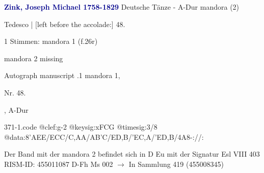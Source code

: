 \documentclass[twocolumn]{book}
\begin{document}
\newline \par \vspace{7pt} \textcolor{darkblue}{\textbf{Zink, Joseph Michael  1758-1829}}
\newline Deutsche Tänze - A-Dur
\newline mandora (2)
\newline \begin{itshape}[f.26r, at left:] Tedesco | [left before the accolade:] 48.\end{itshape} 
\newline \textcolor{darkblue}{}  1 Stimmen: mandora 1  (f.26r)
\newline \begin{small} mandora 2 missing\end{small} 
\newline Autograph manuscript
.1  mandora 1, \begin{itshape}Nr. 48.\end{itshape}, A-Dur  
\begin{filecontents*}{371-1.code}
@clef:g-2
@keysig:xFCG
@timesig:3/8
@data:{8'AEE}/{ECC}/{C,AA}/{AB'C}/{ED,B}/{'EC,A}/{'ED,B}/4A8-://:
\end{filecontents*}
\newline
%
\newline Der Band mit der mandora 2 befindet sich in D Eu mit der Signatur Esl VIII 403
\newline RISM-ID: 455011087
\newline D-Fh  Ms 002
\newline $\rightarrow$ In Sammlung 419 (455008345)
      
\end{document}

